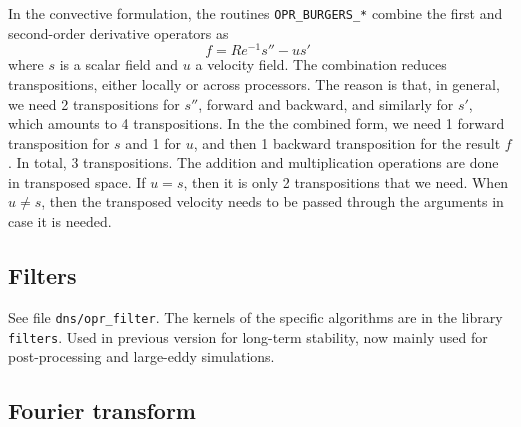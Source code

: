 In the convective formulation, the routines {\tt OPR\_BURGERS\_*} combine the
first and second-order derivative operators as 
\begin{equation}
f=Re^{-1}s'' - u s'\;
\end{equation}
where $s$ is a scalar field and $u$ a velocity field. The combination reduces
transpositions, either locally or across processors. The reason is that, in
general, we need 2 transpositions for $s''$, forward and backward, and similarly
for $s'$, which amounts to 4 transpositions. In the the combined form, we need 1
forward transposition for $s$ and 1 for $u$, and then 1 backward transposition
for the result $f$. In total, 3 transpositions. The addition and multiplication
operations are done in transposed space. If $u= s$, then it is only 2
transpositions that we need. When $u\ne s$, then the transposed velocity needs
to be passed through the arguments in case it is needed.

\subsection{Filters}

See file {\tt dns/opr\_filter}.  The kernels of the specific algorithms are in
the library {\tt filters}. Used in previous version for long-term stability, now
mainly used for post-processing and large-eddy simulations.

\subsection{Fourier transform}


